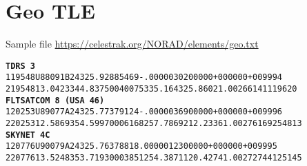 % 

\section{Geo TLE}
Sample file \href{https://celestrak.org/NORAD/elements/geo.txt}{https://celestrak.org/NORAD/elements/geo.txt}

\begin{alltt}
\texttt{\textbf{TDRS 3}}
1 19548U 88091B   24325.92885469 -.00000302  00000+0  00000+0 0  9994
2 19548  13.0423 344.8375 0040075 335.1643  25.8602  1.00266141119620
\texttt{\textbf{FLTSATCOM 8 (USA 46)}}
1 20253U 89077A   24325.77379124 -.00000369  00000+0  00000+0 0  9996
2 20253  12.5869 354.5997 0006168 257.7869 212.2336  1.00276169254813
\texttt{\textbf{SKYNET 4C}}
1 20776U 90079A   24325.76378818  .00000123  00000+0  00000+0 0  9995
2 20776  13.5248 353.7193 0003851 254.3871 120.4274  1.00272744125145
\end{alltt}


\endinput  %
